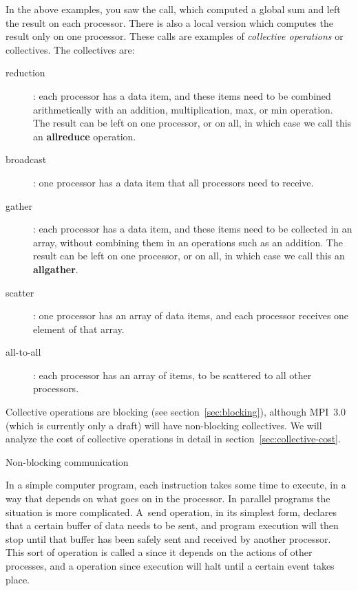 In the above examples, you saw the  call, which
computed a global sum and left the result on each processor. There is
also a local version  which computes the result only on
one processor. These calls are examples of \emph{collective
  operations} or collectives. The collectives are:
\begin{description}
\item[reduction]: each processor has a data item, and these items need
  to be combined arithmetically with an addition, multiplication, max,
  or min operation. The result can be left on one processor, or on
  all, in which case we call this an {\bf allreduce} operation.
\item[broadcast]: one processor has a data item that all processors
  need to receive.
\item[gather]: each processor has a data item, and these items need
  to be collected in an array, without
  combining them in an operations such as an addition. The result can
  be left on one processor, or on all, in which case we call this an
  {\bf allgather}.
\item[scatter]: one processor has an array of data items, and each
  processor receives one element of that array.
\item[all-to-all]: each processor has an array of items, to be
  scattered to all other processors.
\end{description}
Collective operations are blocking (see section~\ref{sec:blocking}),
although MPI~3.0
(which is currently only a draft) will have
non-blocking collectives.
We will analyze the cost of collective operations in detail in
section~\ref{sec:collective-cost}.


 {Non-blocking communication}
\label{sec:nonblocking}

In a simple computer program, each instruction takes some time to
execute, in a way that depends on what goes on in the processor. In
parallel programs the situation is more complicated. A~send operation,
in its simplest form, declares that a certain buffer of data needs to
be sent, and program execution will then stop until that buffer has
been safely sent and received by another processor. This sort of
operation is called a  since it depends
on the actions of other processes, and a  operation since execution will halt until a certain
event takes place.

